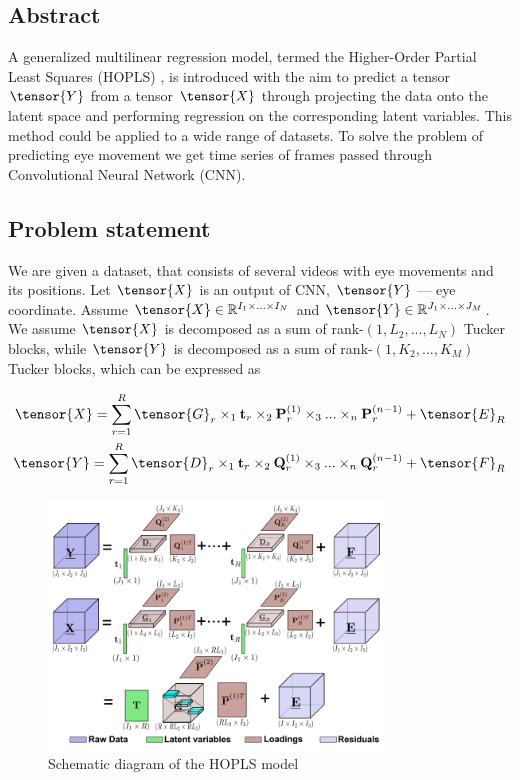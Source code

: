 \documentclass[../../main.tex]{subfiles}
\begin{document}
\subsection{Abstract}

A generalized multilinear regression model, termed the Higher-Order Partial Least Squares (HOPLS) \cite{HOPLS}, is introduced with the aim to predict a tensor $\tensor{Y}$ from a tensor $\tensor{X}$ through projecting the data onto the latent space and performing regression on the corresponding latent variables. This method could be applied to a wide range of datasets. To solve the problem of predicting eye movement we get time series of frames passed through Convolutional Neural Network (CNN).

\subsection{Problem statement}

We are given a dataset, that consists of several videos with eye movements and its positions. Let $\tensor{X}$ is an output of CNN, $\tensor{Y}$ --- eye coordinate. Assume $\tensor{X} \in \mathbb{R}^{I_1 \times ... \times I_N}$ and $\tensor{Y} \in \mathbb{R}^{J_1 \times ... \times J_M}$. We assume $\tensor{X}$ is decomposed as a sum of rank-$(1,L_2,...,L_N)$ Tucker blocks, while $\tensor{Y}$ is decomposed as a sum of rank-$(1, K_2,...,K_M)$ Tucker blocks, which can be expressed as

\begin{equation}
    \begin{split}
        \tensor{X} = \sum_{r=1}^R \tensor{G}_r \times_1 \textbf{t}_r \times_2 \textbf{P}_r^{(1)} \times_3 ... \times_n \textbf{P}_r^{(n-1)} + \tensor{E}_R \\
        \tensor{Y} = \sum_{r=1}^R \tensor{D}_r \times_1 \textbf{t}_r \times_2 \textbf{Q}_r^{(1)} \times_3 ... \times_n \textbf{Q}_r^{(n-1)} + \tensor{F}_R
    \end{split}
\end{equation}

\begin{figure}[h!]
\centering
\includegraphics[width=0.8\textwidth]{figures/HOPLS}
\caption{Schematic diagram of the HOPLS model}
\label{fig:eye_pred:1}
\end{figure} 
\end{document}
